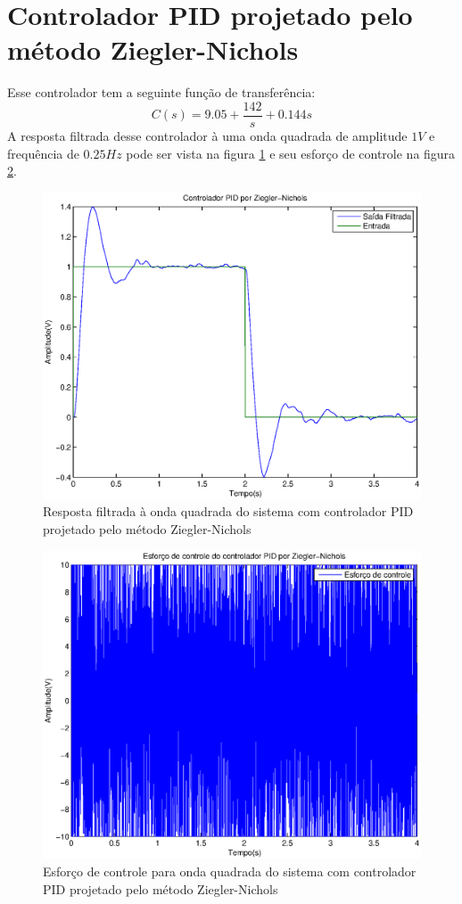 \documentclass{article}
\begin{document}
   \section{Controlador PID projetado pelo método Ziegler-Nichols}
   Esse controlador tem a seguinte função de transferência:
   \begin{equation}
   \label{eq:pidcz}
   C(s) = 9.05+\frac{142}{s}+0.144s
   \end{equation}
   A resposta filtrada desse controlador à uma onda quadrada de amplitude $1 V$ e frequência de $0.25 Hz$ pode ser vista na figura \ref{fig:ypidz} e seu esforço de controle na figura \ref{fig:upidz}.
   \begin{figure}[H]
   	\centering
   	\includegraphics[width=0.8\linewidth]{ypidz}
   	\caption{Resposta filtrada à onda quadrada do sistema com controlador PID projetado pelo método Ziegler-Nichols}
   	\label{fig:ypidz}
   \end{figure}
   \begin{figure}[H]
   	\centering
   	\includegraphics[width=0.8\linewidth]{upidz}
   	\caption{Esforço de controle para onda quadrada do sistema com controlador PID projetado pelo método Ziegler-Nichols}
   	\label{fig:upidz}
   \end{figure}
\end{document}

